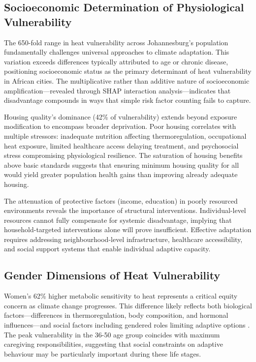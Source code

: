 \documentclass[11pt,a4paper]{article}
\begin{document}
\subsection{Socioeconomic Determination of Physiological Vulnerability}

The 650-fold range in heat vulnerability across Johannesburg's population fundamentally challenges universal approaches to climate adaptation. This variation exceeds differences typically attributed to age or chronic disease, positioning socioeconomic status as the primary determinant of heat vulnerability in African cities. The multiplicative rather than additive nature of socioeconomic amplification---revealed through SHAP interaction analysis---indicates that disadvantage compounds in ways that simple risk factor counting fails to capture.

Housing quality's dominance (42\% of vulnerability) extends beyond exposure modification to encompass broader deprivation. Poor housing correlates with multiple stressors: inadequate nutrition affecting thermoregulation, occupational heat exposure, limited healthcare access delaying treatment, and psychosocial stress compromising physiological resilience. The saturation of housing benefits above basic standards suggests that ensuring minimum housing quality for all would yield greater population health gains than improving already adequate housing.

The attenuation of protective factors (income, education) in poorly resourced environments reveals the importance of structural interventions. Individual-level resources cannot fully compensate for systemic disadvantage, implying that household-targeted interventions alone will prove insufficient. Effective adaptation requires addressing neighbourhood-level infrastructure, healthcare accessibility, and social support systems that enable individual adaptive capacity.

\subsection{Gender Dimensions of Heat Vulnerability}

Women's 62\% higher metabolic sensitivity to heat represents a critical equity concern as climate change progresses. This difference likely reflects both biological factors---differences in thermoregulation, body composition, and hormonal influences---and social factors including gendered roles limiting adaptive options \citep{Gagnon2013, Charkoudian2017}. The peak vulnerability in the 36-50 age group coincides with maximum caregiving responsibilities, suggesting that social constraints on adaptive behaviour may be particularly important during these life stages.
\end{document}
